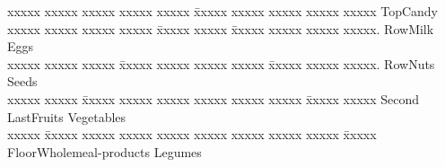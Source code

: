 \documentclass[a4paper, pdftex, english, 11pt]{article}
\begin{document}
\begin{tabbing}

xxxxx xxxxx xxxxx xxxxx xxxxx \= xxxxx xxxxx xxxxx xxxxx xxxxx\kill
Top\>Candy\\
xxxxx xxxxx xxxxx xxxxx \= xxxxx xxxxx \= xxxxx xxxxx xxxxx xxxxx. Row\>Milk \>Eggs\\
xxxxx xxxxx xxxxx \= xxxxx xxxxx xxxxx xxxxx \= xxxxx xxxxx xxxxx. Row\>Nuts \>Seeds\\
xxxxx xxxxx \= xxxxx xxxxx xxxxx xxxxx xxxxx xxxxx \= xxxxx xxxxx\kill
Second Last\>Fruits \>Vegetables\\
xxxxx \= xxxxx xxxxx xxxxx xxxxx xxxxx xxxxx xxxxx xxxxx \= xxxxx\kill
Floor\>Wholemeal-products \>Legumes\\
\end{tabbing}
\end{document}
